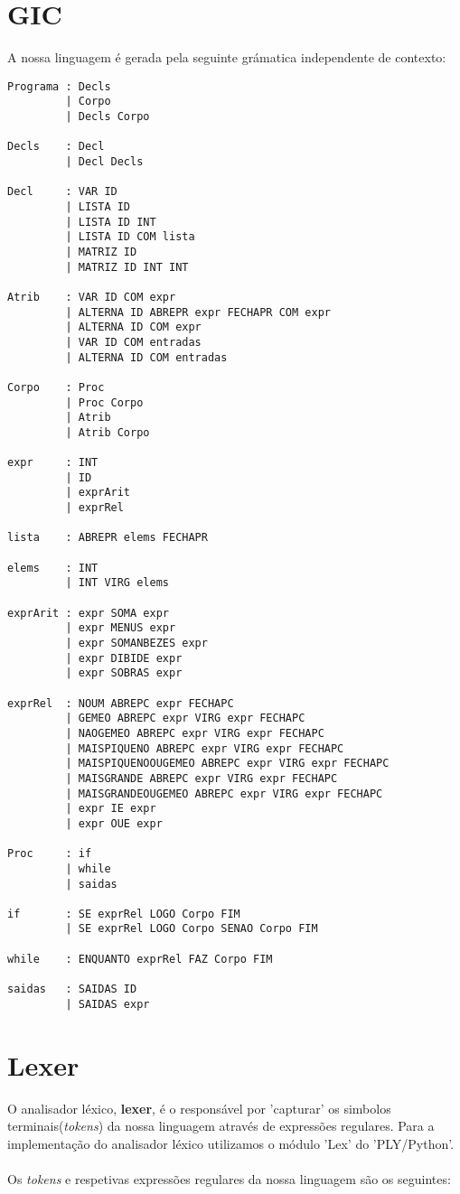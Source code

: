 \documentclass[11pt,a4paper]{report}%
\begin{document}
\section{GIC}
A nossa linguagem é gerada pela seguinte grámatica independente de contexto:
\begin{verbatim}
Programa : Decls 
         | Corpo
         | Decls Corpo

Decls    : Decl
         | Decl Decls

Decl     : VAR ID 
         | LISTA ID
         | LISTA ID INT 
         | LISTA ID COM lista
         | MATRIZ ID 
         | MATRIZ ID INT INT

Atrib    : VAR ID COM expr
         | ALTERNA ID ABREPR expr FECHAPR COM expr
         | ALTERNA ID COM expr
         | VAR ID COM entradas 
         | ALTERNA ID COM entradas

Corpo    : Proc
         | Proc Corpo
         | Atrib 
         | Atrib Corpo

expr     : INT 
         | ID 
         | exprArit
         | exprRel

lista    : ABREPR elems FECHAPR

elems    : INT  
         | INT VIRG elems 

exprArit : expr SOMA expr
         | expr MENUS expr
         | expr SOMANBEZES expr
         | expr DIBIDE expr
         | expr SOBRAS expr

exprRel  : NOUM ABREPC expr FECHAPC
         | GEMEO ABREPC expr VIRG expr FECHAPC
         | NAOGEMEO ABREPC expr VIRG expr FECHAPC
         | MAISPIQUENO ABREPC expr VIRG expr FECHAPC
         | MAISPIQUENOOUGEMEO ABREPC expr VIRG expr FECHAPC
         | MAISGRANDE ABREPC expr VIRG expr FECHAPC
         | MAISGRANDEOUGEMEO ABREPC expr VIRG expr FECHAPC
         | expr IE expr
         | expr OUE expr

Proc     : if
         | while 
         | saidas
        
if       : SE exprRel LOGO Corpo FIM
         | SE exprRel LOGO Corpo SENAO Corpo FIM

while    : ENQUANTO exprRel FAZ Corpo FIM

saidas   : SAIDAS ID 
         | SAIDAS expr            
\end{verbatim}

\newpage

\section{Lexer}
O analisador léxico, \textbf{lexer}, é o responsável por 'capturar' os simbolos terminais(\textit{tokens}) da nossa linguagem através de expressões regulares. Para a implementação do analisador léxico utilizamos o módulo 'Lex' do 'PLY/Python'.\\ \\
Os \textit{tokens} e respetivas expressões regulares da nossa linguagem são os seguintes:
\end{document}
